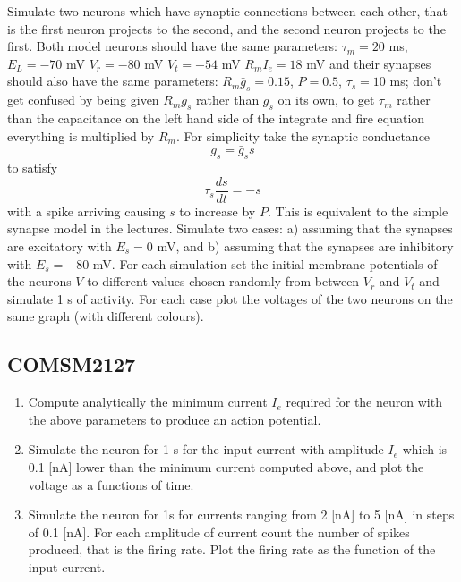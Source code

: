 \documentclass[12pt]{article}
\begin{document}
Simulate two neurons which have synaptic connections between
  each other, that is the first neuron projects to the second, and the
  second neuron projects to the first. Both model neurons should have
  the same parameters: $\tau_m = 20$ ms, $E_L = -70$ mV $V_r = -80$ mV
  $V_t = -54$ mV $R_mI_e = 18$ mV and their synapses should also have
  the same parameters: $R_m \bar{g}_s = 0.15$, $P = 0.5$, $\tau_s= 10$
  ms; don't get confused by being given $R_m\bar{g}_s$ rather than
  $\bar{g}_s$ on its own, to get $\tau_m$ rather than the capacitance
  on the left hand side of the integrate and fire equation everything
  is multiplied by $R_m$. For simplicity take the synaptic conductance
\begin{equation}
g_s=\bar{g}_s s
\end{equation}
to satisfy
\begin{equation}
\tau_s\frac{ds}{dt}=-s
\end{equation}
with a spike arriving causing $s$ to increase by $P$. This is
equivalent to the simple synapse model in the lectures. Simulate two
cases: a) assuming that the synapses are excitatory with $E_s = 0$ mV,
and b) assuming that the synapses are inhibitory with $E_s = -80$
mV. For each simulation set the initial membrane potentials of the
neurons $V$ to different values chosen randomly from between $V_r$ and
$V_t$ and simulate 1 s of activity. For each case plot the voltages of
the two neurons on the same graph (with different colours).

\subsection*{COMSM2127}

\begin{enumerate}

\item Compute analytically the minimum current $I_e$ required for the
  neuron with the above parameters to produce an action
  potential.

\item Simulate the neuron for 1 s for the input current with amplitude
  $I_e$ which is 0.1 [nA] lower than the minimum current computed
  above, and plot the voltage as a functions of time.

\item Simulate the neuron for 1s for currents ranging from 2 [nA] to 5
  [nA] in steps of 0.1 [nA]. For each amplitude of current count the
  number of spikes produced, that is the firing rate. Plot the firing
  rate as the function of the input current. 

\end{enumerate}
\end{document}
